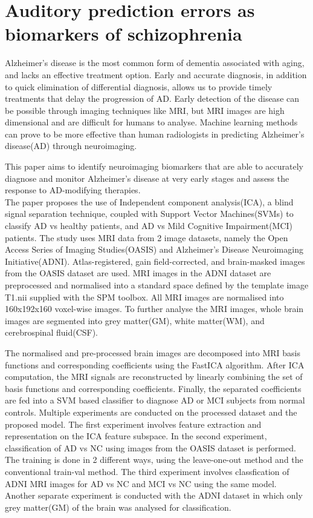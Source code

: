 \documentclass[11pt]{article}
\begin{document}
  \section*{Auditory prediction errors as biomarkers of schizophrenia}
  Alzheimer’s disease is the most common form of dementia associated with aging, and lacks an effective treatment option. Early and accurate diagnosis, in addition to quick elimination of differential diagnosis, allows us to provide timely treatments that delay the progression of AD. Early detection of the disease can be possible through imaging techniques like MRI, but MRI images are high dimensional and are difficult for humans to analyse. Machine learning methods can prove to be more effective than human radiologists in predicting Alzheimer’s disease(AD) through neuroimaging.

  This paper aims to identify neuroimaging biomarkers that are able to accurately diagnose and monitor Alzheimer’s disease at very early stages and assess the response to AD-modifying therapies.\\

  The paper proposes the use of Independent component analysis(ICA), a blind signal separation technique, coupled with Support Vector Machines(SVMs) to classify AD vs healthy patients, and AD vs Mild Cognitive Impairment(MCI) patients.
  The study uses MRI data from 2 image datasets, namely the Open Access Series of Imaging Studies(OASIS) and Alzheimer’s Disease Neuroimaging Initiative(ADNI).
  Atlas-registered, gain field-corrected, and brain-masked images from the OASIS dataset are used.
  MRI images in the ADNI dataset are preprocessed and normalised into a standard space defined by the template image T1.nii supplied with the SPM toolbox.
  All MRI images are normalised into 160x192x160 voxel-wise images.
  To further analyse the MRI images, whole brain images are segmented into grey matter(GM), white matter(WM), and cerebrospinal fluid(CSF).

  The normalised and pre-processed brain images are decomposed into MRI basis functions and corresponding coefficients using the FastICA algorithm. 
  After ICA computation, the MRI signals are reconstructed by linearly combining the set of basis functions and corresponding coefficients.
  Finally, the separated coefficients are fed into a SVM based classifier to diagnose AD or MCI subjects from normal controls.
  Multiple experiments are conducted on the processed dataset and the proposed model.
  The first experiment involves feature extraction and representation on the ICA feature subspace.
  In the second experiment, classification of AD vs NC using images from the OASIS dataset is performed. The training is done in 2 different ways, using the leave-one-out method and the conventional train-val method.
  The third experiment involves classfication of ADNI MRI images for AD vs NC and MCI vs NC using the same model.
  Another separate experiment is conducted with the ADNI dataset in which only grey matter(GM) of the brain was analysed for classification.\\
\end{document}
